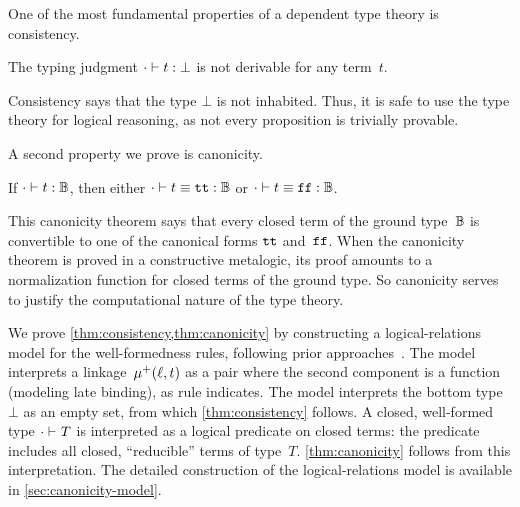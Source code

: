 One of the most fundamental properties of a dependent type theory is consistency.
\begin{theorem}[Consistency]
\label{thm:consistency}
  The typing judgment $ {\cdot} \vdash {t} : {\bot} $ is not derivable for any term~$t$.
\end{theorem}

\noindent
Consistency says that the type $\bot$ is not inhabited.
Thus, it is safe to use the type theory for logical reasoning, as not
every proposition is trivially provable.

A second property we prove is canonicity.

\begin{theorem}[Canonicity]
\label{thm:canonicity}
  If $ {\cdot} \vdash {t} : {\mathbb{B}} $, then either $ {\cdot} \vdash {t \equiv \ensuremath{\texttt{tt}}} : {\mathbb{B}} $ or $ {\cdot} \vdash {t \equiv \ensuremath{\texttt{ff}}} : {\mathbb{B}} $.
\end{theorem}

\noindent
This canonicity theorem says that every closed term of the ground
type~$\mathbb{B}$ is convertible to one of the canonical forms $\texttt{tt}$ and~$\texttt{ff}$.
When the canonicity theorem is proved in a constructive meta\-logic, its proof
amounts to a normalization function for closed terms of the ground type.
So canonicity serves to justify the computational nature of the type theory.

We prove \cref{thm:consistency,thm:canonicity} by constructing a logical-relations model
for the well-formedness rules, following prior approaches~\cite{coquand2018canonicity,kaposi2019gluing,sterling2019algebraic}.
%
The model interprets a linkage~$\mu^+({\ell},{t})$ as a pair where the
second component is a function (modeling late binding),
as rule  indicates.
%
The model interprets the bottom type~$\bot$ as an empty set, from which
\cref{thm:consistency} follows.
A closed, well-formed type $ {\cdot} \vdash_{} {T} $ is interpreted as
a logical predicate on closed terms: the predicate includes all
closed, ``reducible'' terms of type~$T$.
\cref{thm:canonicity} follows from this interpretation.
The detailed construction of the logical-relations model is available in
\ifreport
\cref{sec:canonicity-model}.
\else

\fi
